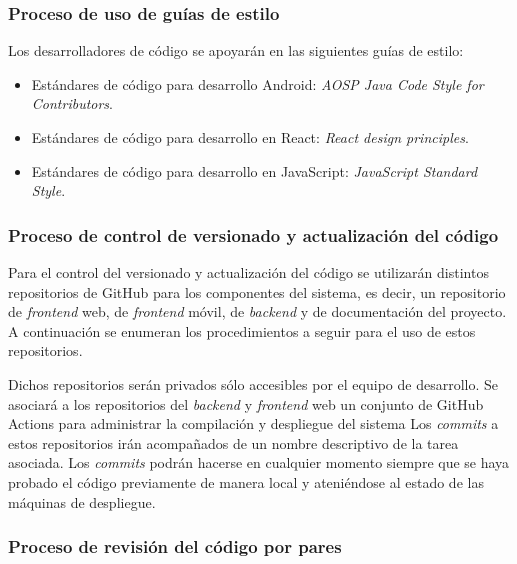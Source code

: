 \documentclass{article}
\begin{document}

\subsubsection{Proceso de uso de guías de estilo} \label{P.EC.10}

Los desarrolladores de código se apoyarán en las siguientes guías de estilo:

\begin{itemize}
   \setlength{\itemsep}{0em}
   \item Estándares de código para desarrollo Android: \textit{AOSP Java Code Style for Contributors}.
   \item Estándares de código para desarrollo en React: \textit{React design principles}.
   \item Estándares de código para desarrollo en JavaScript: \textit{JavaScript Standard Style}.
\end{itemize}

\subsubsection{Proceso de control de versionado y actualización del código} \label{P.EC.11}

Para el control del versionado y actualización del código se utilizarán distintos repositorios de GitHub para los componentes del sistema, es decir, un repositorio de \textit{frontend} web, de \textit{frontend} móvil, de \textit{backend} y de documentación del proyecto. A continuación se enumeran los procedimientos a seguir para el uso de estos repositorios.

Dichos repositorios serán privados sólo accesibles por el equipo de desarrollo. 
Se asociará a los repositorios del \textit{backend} y \textit{frontend} web un conjunto de GitHub Actions para administrar la compilación y despliegue del sistema
Los \textit{commits} a estos repositorios irán acompañados de un nombre descriptivo de la tarea asociada. 
Los \textit{commits} podrán hacerse en cualquier momento siempre que se haya probado el código previamente de manera local y ateniéndose al estado de las máquinas de despliegue. 

\subsubsection{Proceso de revisión del código por pares} \label{P.EC.12}
\end{document}
